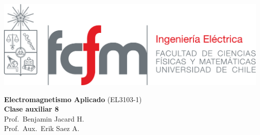 \documentclass[
  11pt,
  letterpaper,
   addpoints,
   answers
  ]{exam}
\begin{document}
\noindent
\begin{minipage}{0.47\textwidth}
\includegraphics[width=\textwidth]{../fcfm_die}
\end{minipage}
\begin{minipage}{0.53\textwidth}
\begin{center} 
\large\textbf{Electromagnetismo Aplicado} (EL3103-1) \\
\large\textbf{Clase auxiliar 8} \\
\normalsize Prof.~Benjamin Jacard H.\\
\normalsize Prof.~Aux.~Erik Saez A.
\end{center}
\end{minipage}
\end{document}
